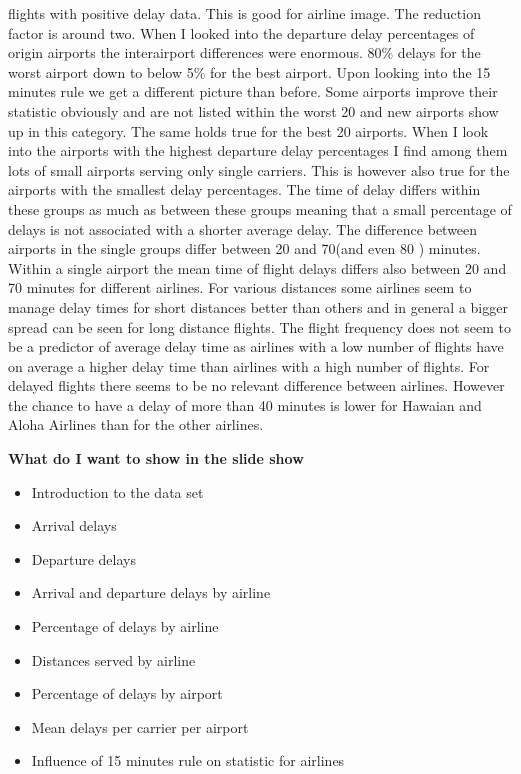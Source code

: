 \documentclass[11pt]{article}
\providecommand{\tightlist}{%
      \setlength{\itemsep}{0pt}\setlength{\parskip}{0pt}}
\begin{document}
{flights with positive delay data. This is good for airline image. The
reduction factor is around two. When I looked into the departure delay
percentages of origin airports the interairport differences were
enormous. 80\% delays for the worst airport down to below 5\% for the
best airport. Upon looking into the 15 minutes rule we get a different
picture than before. Some airports improve their statistic obviously and
are not listed within the worst 20 and new airports show up in this
category. The same holds true for the best 20 airports. When I look into
the airports with the highest departure delay percentages I find among
them lots of small airports serving only single carriers. This is
however also true for the airports with the smallest delay percentages.
The time of delay differs within these groups as much as between these
groups meaning that a small percentage of delays is not associated with
a shorter average delay. The difference between airports in the single
groups differ between 20 and 70(and even 80 ) minutes. Within a single
airport the mean time of flight delays differs also between 20 and 70
minutes for different airlines. For various distances some airlines seem
to manage delay times for short distances better than others and in
general a bigger spread can be seen for long distance flights. The
flight frequency does not seem to be a predictor of average delay time
as airlines with a low number of flights have on average a higher delay
time than airlines with a high number of flights. For delayed flights
there seems to be no relevant difference between airlines. However the
chance to have a delay of more than 40 minutes is lower for Hawaian and
Aloha Airlines than for the other airlines.}

    \textbf{What do I want to show in the slide show}

\begin{itemize}
\tightlist
\item
  Introduction to the data set
\item
  Arrival delays
\item
  Departure delays
\item
  Arrival and departure delays by airline
\item
  Percentage of delays by airline
\item
  Distances served by airline
\item
  Percentage of delays by airport
\item
  Mean delays per carrier per airport
\item
  Influence of 15 minutes rule on statistic for airlines
\end{itemize}
\end{document}
